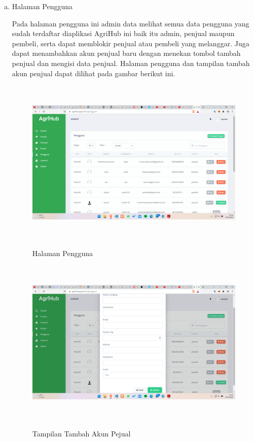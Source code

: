 \begin{enumerate}
\begin{enumerate}[a.]
		\item Halaman Pengguna
		\par Pada halaman pengguna ini admin data melihat semua data pengguna yang sudah terdaftar diaplikasi AgriHub ini baik itu admin, penjual maupun pembeli, serta dapat memblokir penjual atau pembeli yang melanggar. Juga dapat menambahkan akun penjual baru dengan menekan tombol tambah penjual dan mengisi data penjual. Halaman pengguna dan tampilan tambah akun penjual dapat dilihat pada gambar berikut ini.
		\begin{figure}[H]
			\centering
			{\includegraphics [width = 13.3cm, height= 8cm]{gambar/admin/pengguna}}
			\caption{Halaman Pengguna}
			\label{pengguna}
		\end{figure}
		\begin{figure}[H]
			\centering
			{\includegraphics [width = 13.3cm, height= 8cm]{gambar/admin/tambah_pengguna}}
			\caption{Tampilan Tambah Akun Pejual}
			\label{tambah_pengguna}
		\end{figure}


\end{enumerate}
\end{enumerate}
